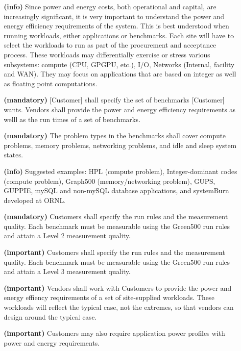 \begin{itemize}

\item[\textbf{(info)}]
Since power and energy costs, both operational and capital, are increasingly significant, 
it is very important to understand the power and energy efficiency requirements of the system.  
This is best understood when running workloads, either applications or benchmarks.  
Each site will have to select the workloads to run as part of the procurement and 
acceptance process.  These workloads may differentially exercise or stress various 
subsystems: compute (CPU, GPGPU, etc.), I/O, Networks (Internal, facility and WAN).  
They may focus on applications that are based on integer as well as floating point computations.

\item[\textbf{(mandatory)}]
[Customer] shall specify the set of benchmarks [Customer] wants. Vendors shall 
provide the power and energy efficiency requirements as welll as the run times 
of a set of benchmarks. 

\item[\textbf{(mandatory)}]
The problem types in the benchmarks shall cover compute problems, memory problems, 
networking problems, and idle and sleep system states.

\item[\textbf{(info)}]
Suggested examples: HPL (compute problem), Integer-dominant codes (compute problem), 
Graph500 (memory/networking problem), GUPS, GUPPIE,  mySQL and non-mySQL database 
applications, and systemBurn developed at ORNL. 

\item[\textbf{(mandatory)}]
Customers shall specify the run rules and the measurement quality. Each benchmark 
must be measurable using the Green500 run rules and attain a Level 2 measurement quality. 

\item[\textbf{(important)}]
Customers shall specify the run rules and the measurement quality. Each benchmark 
must be measurable using the Green500 run rules and attain a Level 3 measurement quality. 

\item[\textbf{(important)}]
Vendors shall work with Customers to provide the power and energy effiency requirements 
of a set of site-supplied workloads. These workloads will reflect the typical case, 
not the extremes, so that vendors can design around the typical case. 

\item[\textbf{(important)}]
Customers may also require application power profiles with power and energy requirements.
\end{itemize}

